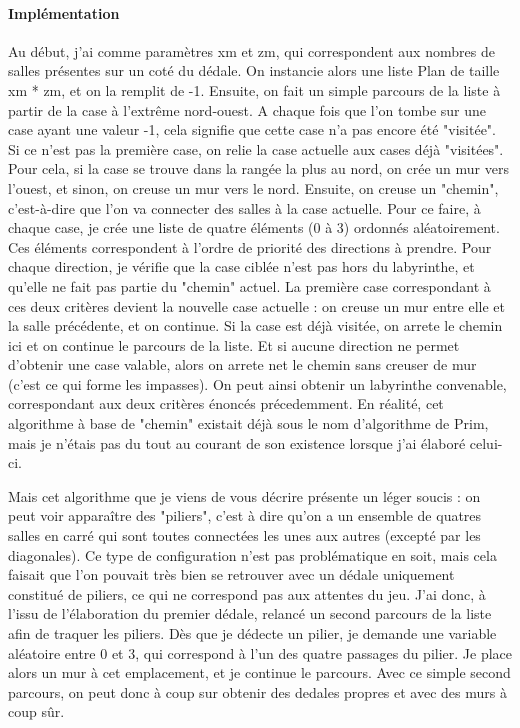 \documentclass{article}
\begin{document}
\paragraph{Implémentation}
Au début, j'ai comme paramètres xm et zm, qui correspondent aux nombres de salles présentes sur un coté du dédale. On instancie alors une liste Plan de taille xm * zm, et on la remplit de -1.
Ensuite, on fait un simple parcours de la liste à partir de la case à l'extrême nord-ouest. A chaque fois que l'on tombe sur une case ayant une valeur -1, cela signifie que cette case n'a pas encore été "visitée". Si ce n'est pas la première case, on relie la case actuelle aux cases déjà "visitées". Pour cela, si la case se trouve dans la rangée la plus au nord, on crée un mur vers l'ouest, et sinon, on creuse un mur vers le nord. Ensuite, on creuse un "chemin", c'est-à-dire que l'on va connecter des salles à la case actuelle. Pour ce faire, à chaque case, je crée une liste de quatre éléments (0 à 3) ordonnés aléatoirement. Ces éléments correspondent à l'ordre de priorité des directions à prendre. Pour chaque direction, je vérifie que la case ciblée n'est pas hors du labyrinthe, et qu'elle ne fait pas partie du "chemin" actuel. La première case correspondant à ces deux critères devient la nouvelle case actuelle : on creuse un mur entre elle et la salle précédente, et on continue. Si la case est déjà visitée, on arrete le chemin ici et on continue le parcours de la liste. Et si aucune direction ne permet d'obtenir une case valable, alors on arrete net le chemin sans creuser de mur (c'est ce qui forme les impasses). On peut ainsi obtenir un labyrinthe convenable, correspondant aux deux critères énoncés précedemment.
En réalité, cet algorithme à base de "chemin" existait déjà sous le nom d'algorithme de Prim, mais je n'étais pas du tout au courant de son existence lorsque j'ai élaboré celui-ci.

Mais cet algorithme que je viens de vous décrire présente un léger soucis : on peut voir apparaître des "piliers", c'est à dire qu'on a un ensemble de quatres salles en carré qui sont toutes connectées les unes aux autres (excepté par les diagonales). Ce type de configuration n'est pas problématique en soit, mais cela faisait que l'on pouvait très bien se retrouver avec un dédale uniquement constitué de piliers, ce qui ne correspond pas aux attentes du jeu. J'ai donc, à l'issu de l'élaboration du premier dédale, relancé un second parcours de la liste afin de traquer les piliers. Dès que je dédecte un pilier, je demande une variable aléatoire entre 0 et 3, qui correspond à l'un des quatre passages du pilier. Je place alors un mur à cet emplacement, et je continue le parcours. Avec ce simple second parcours, on peut donc à coup sur obtenir des dedales propres et avec des murs à coup sûr.
\end{document}
